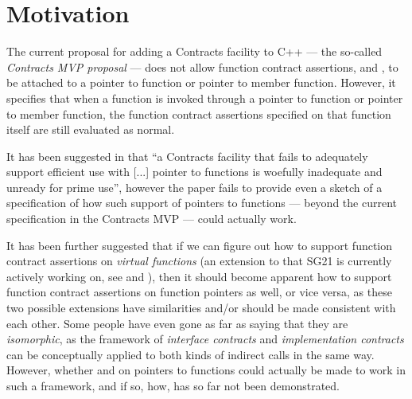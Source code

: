 
\tableofcontents*





\section{Motivation}
\label{sec:intro}

The current proposal \cite{P2900R7} for adding a Contracts facility to C++ --- the so-called \emph{Contracts MVP proposal} --- does not allow function contract assertions,  and , to be attached to a pointer to function or pointer to member function. However, it specifies that when a function is invoked through a pointer to function or pointer to member function, the function contract assertions specified on that function itself are still evaluated as normal.

It has been suggested in \cite{P3173R0} that ``a Contracts facility that fails to adequately support efficient use with [...] pointer to functions is woefully inadequate and unready for prime use'', however the paper fails to provide even a sketch of a specification of how such support of pointers to functions --- beyond the current specification in the Contracts MVP --- could actually work.

It has been further suggested that if we can figure out how to support function contract assertions on \emph{virtual functions} (an extension to \cite{P2900R7} that SG21 is currently actively working on, see \cite{P3097R0} and \cite{P3165R0}), then it should become apparent how to support function contract assertions on function pointers as well, or vice versa, as these two possible extensions have similarities and/or should be made consistent with each other. Some people have even gone as far as saying that they are \emph{isomorphic}, as the framework of \emph{interface contracts} and \emph{implementation contracts} can be conceptually applied to both kinds of indirect calls in the same way. However, whether  and  on pointers to functions could actually be made to work in such a framework, and if so, how, has so far not been demonstrated.

